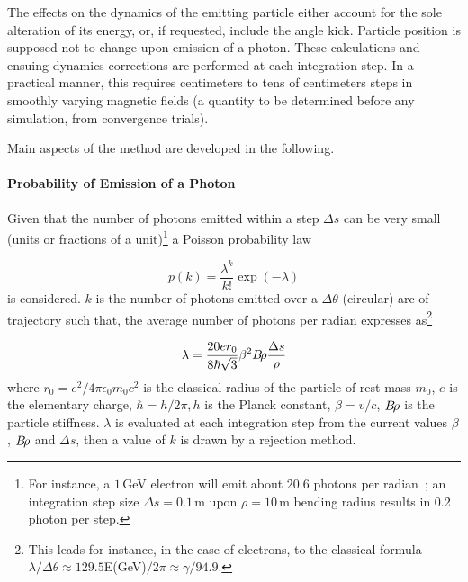 \noindent The effects on the dynamics of the emitting particle 
 either account for the sole  alteration of its  energy, or, if requested, include the angle kick.
Particle position is supposed not to  change upon emission of a photon. These calculations 
 and ensuing dynamics corrections are performed at 
 each integration step. In a practical manner, this requires 
 centimeters  to tens of centimeters steps in smoothly varying magnetic fields (a quantity to 
be determined before any simulation, from convergence trials). 

\medskip 


\noindent Main aspects of the method are developed in the following. 



\paragraph{Probability of Emission of a Photon}

Given that the number of photons emitted within a step $\Delta s$ can be very small  (units or fractions 
of a unit)\footnote{For instance, a $1\,$GeV electron will emit about $20.6$ photons per radian~; an 
 integration step size $\Delta s =0.1\,$m upon $\rho=10\,$m bending radius results in 0.2 photon  
per step.} a Poisson probability law 

\begin{equation}
	\label{EqPoiss}
 p(k) = \dfrac{\lambda^k}{k!} \exp(-\lambda)
\end{equation}
%
is considered. $k$ is the number of photons emitted over a $\Delta \theta$ (circular) arc of 
trajectory  such that, the average number of photons per radian expresses as\footnote{This leads for 
instance, in the case of electrons, to the classical formula $\lambda/\Delta \theta \approx
129.5$E(GeV)$/2\pi\approx \gamma/94.9$.}

\begin{equation}
        \label{EqPoissMean}
 \lambda = \dfrac{20 e r_0 }{8 \hbar \sqrt{3}  } \beta^2 B\!\rho  \dfrac{\Delta s}{\rho}
\end{equation}
%
where $r_0=e^2/4\pi \epsilon_0 m_0 c^2$ is the classical radius of the particle of rest-mass $m_0$, 
$e$ is the elementary 
charge, $\hbar = h/2\pi , h$ is the Planck constant, $\beta = v/c$, $B\!\rho$ is the particle 
stiffness. $\lambda$ is evaluated at each integration step from the current values $\beta$, $B\!\rho$ 
and $\Delta s$,  then a value of $k$ is drawn by a rejection method.  


